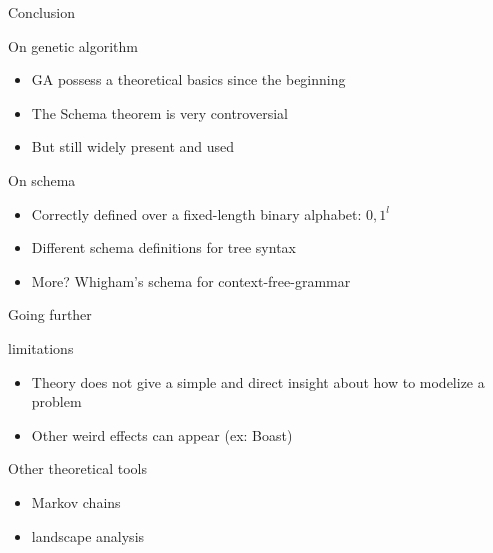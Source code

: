\begin{frame}{Conclusion}

  \begin{block}{On genetic algorithm}
    \begin{itemize}
    \item GA possess a theoretical basics since the beginning
    \item The Schema theorem is very controversial
    \item But still widely present and used
    \end{itemize}
  \end{block}

  \begin{block}{On schema}
    \begin{itemize}
      \item Correctly defined over a fixed-length binary alphabet: ${0,1}^l$
      \item Different schema definitions for tree syntax
      \item More? Whigham's schema for context-free-grammar\cite{whigham1995}
    \end{itemize}
  \end{block}
\end{frame}

\begin{frame}{Going further}
  \begin{block}{limitations}
    \begin{itemize}
      \item Theory does not give a simple and direct insight about how to modelize a problem
      \item Other weird effects can appear (ex: Boast)
    \end{itemize}
  \end{block}

  \begin{block}{Other theoretical tools}
    \begin{itemize}
      \item Markov chains
      \item landscape analysis
    \end{itemize}
  \end{block}
\end{frame}
